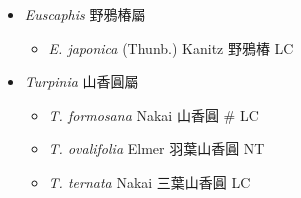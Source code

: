 
  \begin{itemize}
 \item[] \textit{Euscaphis} 野鴉椿屬
                                
  \begin{itemize}
        \item[] \textit{E. japonica} (Thunb.) Kanitz  野鴉椿   LC
  \end{itemize}
 \item[] \textit{Turpinia} 山香圓屬
                                
  \begin{itemize}
        \item[] \textit{T. formosana} Nakai  山香圓  \# LC
        \item[] \textit{T. ovalifolia} Elmer  羽葉山香圓   NT
        \item[] \textit{T. ternata} Nakai  三葉山香圓   LC
  \end{itemize}
  \end{itemize}
